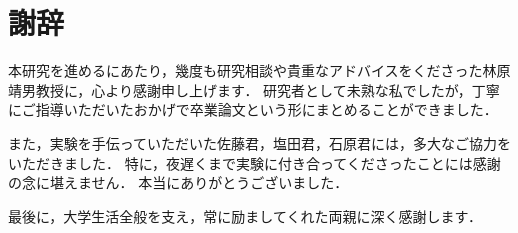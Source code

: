 \chapter*{謝辞}

本研究を進めるにあたり，幾度も研究相談や貴重なアドバイスをくださった林原靖男教授に，心より感謝申し上げます．
研究者として未熟な私でしたが，丁寧にご指導いただいたおかげで卒業論文という形にまとめることができました．

また，実験を手伝っていただいた佐藤君，塩田君，石原君には，多大なご協力をいただきました．
特に，夜遅くまで実験に付き合ってくださったことには感謝の念に堪えません．
本当にありがとうございました．

最後に，大学生活全般を支え，常に励ましてくれた両親に深く感謝します．
%
